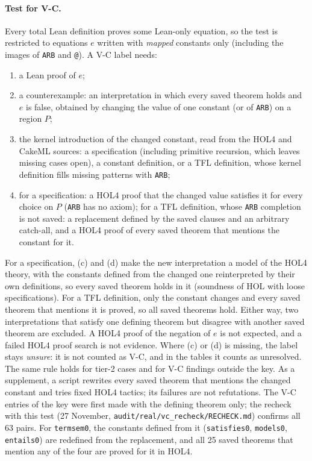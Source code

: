 \documentclass[11pt,a4paper]{article}
\newcommand{\code}[1]{\texttt{#1}}
\begin{document}
\paragraph{Test for V-C.} Every total Lean definition proves some Lean-only equation, so the test is restricted to equations $e$ written with \emph{mapped} constants only (including the images of \code{ARB} and \code{@}). A V-C label needs:
\begin{enumerate}[label=(\alph*)]
\item a Lean proof of $e$;
\item a counterexample: an interpretation in which every saved theorem holds and $e$ is false, obtained by changing the value of one constant (or of \code{ARB}) on a region $P$;
\item the kernel introduction of the changed constant, read from the HOL4 and CakeML sources: a specification (including primitive recursion, which leaves missing cases open), a constant definition, or a TFL definition, whose kernel definition fills missing patterns with \code{ARB};
\item for a specification: a HOL4 proof that the changed value satisfies it for every choice on $P$ (\code{ARB} has no axiom); for a TFL definition, whose \code{ARB} completion is not saved: a replacement defined by the saved clauses and an arbitrary catch-all, and a HOL4 proof of every saved theorem that mentions the constant for it.
\end{enumerate}
For a specification, (c) and (d) make the new interpretation a model of the HOL4 theory, with the constants defined from the changed one reinterpreted by their own definitions, so every saved theorem holds in it (soundness of HOL with loose specifications). For a TFL definition, only the constant changes and every saved theorem that mentions it is proved, so all saved theorems hold. Either way, two interpretations that satisfy one defining theorem but disagree with another saved theorem are excluded. A HOL4 proof of the negation of $e$ is not expected, and a failed HOL4 proof search is not evidence. Where (c) or (d) is missing, the label stays \emph{unsure}: it is not counted as V-C, and in the tables it counts as unresolved. The same rule holds for tier-2 cases and for V-C findings outside the key. As a supplement, a script rewrites every saved theorem that mentions the changed constant and tries fixed HOL4 tactics; its failures are not refutations. The V-C entries of the key were first made with the defining theorem only; the recheck with this test (27 November, \code{audit/real/vc\_recheck/RECHECK.md}) confirms all 63 pairs. For \code{termsem0}, the constants defined from it (\code{satisfies0}, \code{models0}, \code{entails0}) are redefined from the replacement, and all 25 saved theorems that mention any of the four are proved for it in HOL4.
\end{document}
